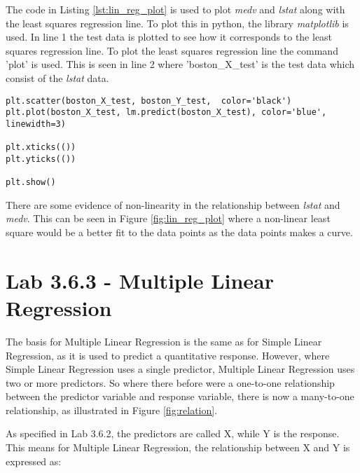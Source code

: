 
The code in Listing \ref{lst:lin_reg_plot} is used to plot \emph{medv} and \emph{lstat} along with the least squares regression line. To plot this in python, the library \emph{matplotlib} is used. In line 1 the test data is plotted to see how it corresponds to the least squares regression line. To plot the least squares regression line the command 'plot' is used. This is seen in line 2 where 'boston\_X\_test' is the test data which consist of the \emph{lstat} data. 

\begin{lstlisting}[caption={Python Plotting of Linear Regression function}, label=lst:lin_reg_plot, mathescape=true]
plt.scatter(boston_X_test, boston_Y_test,  color='black')
plt.plot(boston_X_test, lm.predict(boston_X_test), color='blue',
linewidth=3)

plt.xticks(())
plt.yticks(())

plt.show()
\end{lstlisting}

There are some evidence of non-linearity in the relationship between \emph{lstat} and \emph{medv}. This can be seen in Figure \ref{fig:lin_reg_plot} where a non-linear least square would be a better fit to the data points as the data points makes a curve. 


\section{Lab 3.6.3 - Multiple Linear Regression}

The basis for Multiple Linear Regression is the same as for Simple Linear Regression, as it is used to predict a quantitative response. However, where Simple Linear Regression uses a single predictor, Multiple Linear Regression uses two or more predictors. So where there before were a one-to-one relationship between the predictor variable and response variable, there is now a many-to-one relationship, as illustrated in Figure \ref{fig:relation}.


\FloatBarrier
As specified in Lab 3.6.2, the predictors are called X, while Y is the response. This means for Multiple Linear Regression, the relationship between X and Y is expressed as:


